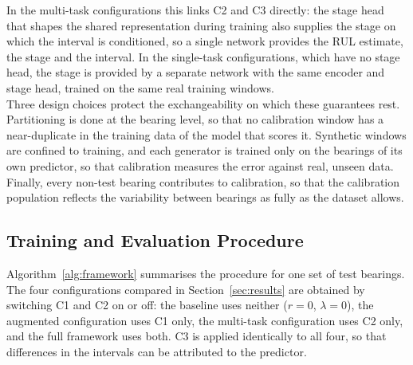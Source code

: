 \documentclass[review]{elsarticle}
\begin{document}
In the multi-task configurations this links C2 and C3 directly: the
stage head that shapes the shared representation during training also
supplies the stage on which the interval is conditioned, so a single
network provides the RUL estimate, the stage and the interval. In the
single-task configurations, which have no stage head, the stage is
provided by a separate network with the same encoder and stage head,
trained on the same real training windows.\\

Three design choices protect the exchangeability on which these
guarantees rest. Partitioning is done at the bearing level, so that no
calibration window has a near-duplicate in the training data of the
model that scores it. Synthetic windows are confined to training, and
each generator is trained only on the bearings of its own predictor,
so that calibration measures the error against real, unseen data.
Finally, every non-test bearing contributes to calibration, so that
the calibration population reflects the variability between bearings
as fully as the dataset allows.

\subsection{Training and Evaluation Procedure}
\label{sec:method_procedure}

Algorithm~\ref{alg:framework} summarises the procedure for one set of
test bearings. The four configurations compared in
Section~\ref{sec:results} are obtained by switching C1 and C2 on or
off: the baseline uses neither ($r = 0$, $\lambda = 0$), the augmented
configuration uses C1 only, the multi-task configuration uses C2 only,
and the full framework uses both. C3 is applied identically to all
four, so that differences in the intervals can be attributed to the
predictor.
\end{document}
